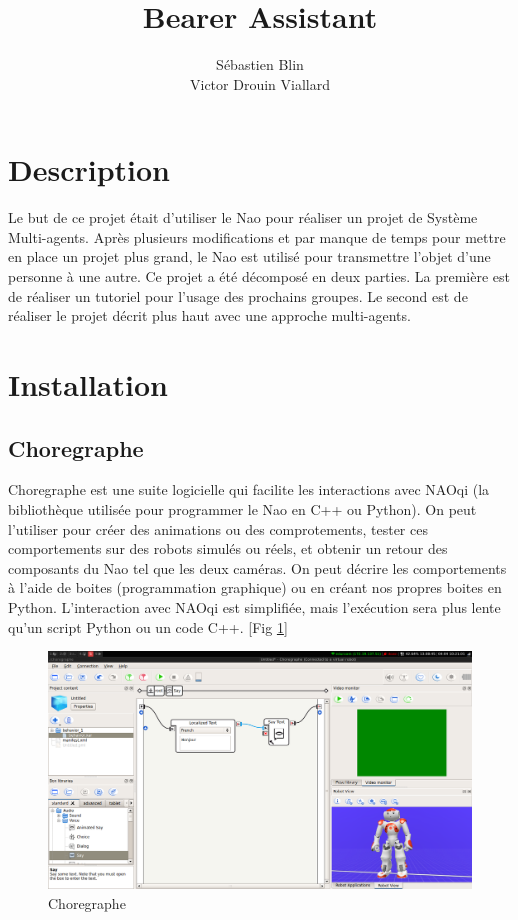 \documentclass{article}
\title{Bearer Assistant}
\author{Sébastien Blin\\Victor Drouin Viallard}
\begin{document}
\maketitle

\section{Description}
Le but de ce projet était d'utiliser le Nao pour réaliser un projet de Système Multi-agents. Après plusieurs modifications et par manque de temps pour mettre en place un projet plus grand, le Nao est utilisé pour transmettre l'objet d'une personne à une autre. Ce projet a été décomposé en deux parties. La première est de réaliser un tutoriel pour l'usage des prochains groupes. Le second est de réaliser le projet décrit plus haut avec une approche multi-agents.


\section{Installation}
\subsection{Choregraphe}

Choregraphe est une suite logicielle qui facilite les interactions avec NAOqi (la bibliothèque utilisée pour programmer le Nao en C++ ou Python). On peut l'utiliser pour créer des animations ou des comprotements, tester ces comportements sur des robots simulés ou réels, et obtenir un retour des composants du Nao tel que les deux caméras. On peut décrire les comportements à l'aide de boites (programmation graphique) ou en créant nos propres boites en Python. L'interaction avec NAOqi est simplifiée, mais l'exécution sera plus lente qu'un script Python ou un code C++. [Fig \ref{fig:choregraphe}]

\begin{figure}[h]
	\begin{center}
			\includegraphics[scale=0.2]{img/choregraphe}
		\caption{Choregraphe}
		\label{fig:choregraphe}
	\end{center}
\end{figure}
\end{document}
